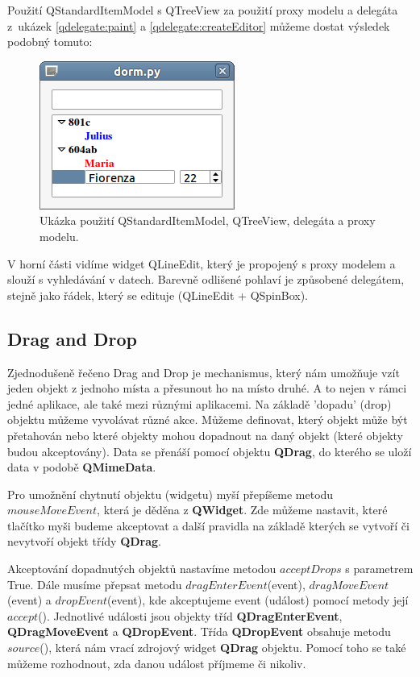 Použití QStandardItemModel s QTreeView za použití proxy modelu a delegáta z~ukázek \ref{qdelegate:paint} a \ref{qdelegate:createEditor} můžeme dostat výsledek podobný tomuto:

\begin{figure}[h]
	\centering
	\includegraphics[scale=0.7]{pictures/qt/dorm}
	\caption{Ukázka použití QStandardItemModel, QTreeView, delegáta a proxy modelu.}
	\label{pic:delegate}
\end{figure} 

\noindent
V horní části vidíme widget QLineEdit, který je propojený s proxy modelem a slouží s vyhledávání v datech. Barevně odlišené pohlaví je způsobené delegátem, stejně jako řádek, který se edituje (QLineEdit + QSpinBox). %

\subsection{Drag and Drop}
Zjednodušeně řečeno Drag and Drop je mechanismus, který nám umožňuje vzít jeden objekt z jednoho místa a přesunout ho na místo druhé. A to nejen v rámci jedné aplikace, ale také mezi různými aplikacemi. Na základě 'dopadu' (drop) objektu můžeme vyvolávat různé akce. Můžeme definovat, který objekt může být přetahován nebo které objekty mohou dopadnout na daný objekt (které objekty budou akceptovány). Data se přenáší pomocí objektu \textbf{QDrag}, do kterého se uloží data v podobě \textbf{QMimeData}.

Pro umožnění chytnutí objektu (widgetu) myší přepíšeme metodu $mouseMoveEvent$, která je děděna z \textbf{QWidget}. Zde můžeme nastavit, které tlačítko myši budeme akceptovat a další pravidla na základě kterých se vytvoří či nevytvoří objekt třídy \textbf{QDrag}. 

Akceptování dopadnutých objektů nastavíme metodou $acceptDrops$ s parametrem True. Dále musíme přepsat metodu $dragEnterEvent$(event), $dragMoveEvent$(event) a $dropEvent$(event), kde akceptujeme event (událost) pomocí metody její $accept$(). Jednotlivé události jsou objekty tříd \textbf{QDragEnterEvent}, \textbf{QDragMoveEvent} a \textbf{QDropEvent}. Třída \textbf{QDropEvent} obsahuje metodu $source$(), která nám vrací zdrojový widget \textbf{QDrag} objektu. Pomocí toho se také můžeme rozhodnout, zda danou událost příjmeme či nikoliv.

